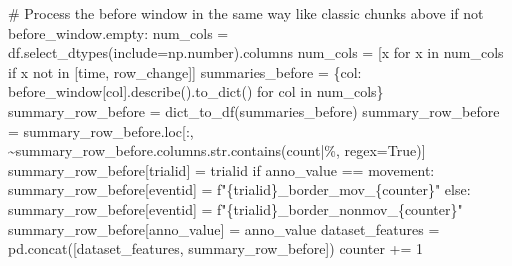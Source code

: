 \documentclass[
  letterpaper,
  DIV=11,
  numbers=noendperiod]{scrreprt}
\newenvironment{Shaded}{\begin{snugshade}}{\end{snugshade}}
\newcommand{\BuiltInTok}[1]{\textcolor[rgb]{0.00,0.23,0.31}{#1}}
\newcommand{\CommentTok}[1]{\textcolor[rgb]{0.37,0.37,0.37}{#1}}
\newcommand{\ControlFlowTok}[1]{\textcolor[rgb]{0.00,0.23,0.31}{#1}}
\newcommand{\DecValTok}[1]{\textcolor[rgb]{0.68,0.00,0.00}{#1}}
\newcommand{\KeywordTok}[1]{\textcolor[rgb]{0.00,0.23,0.31}{#1}}
\newcommand{\NormalTok}[1]{\textcolor[rgb]{0.00,0.23,0.31}{#1}}
\newcommand{\OperatorTok}[1]{\textcolor[rgb]{0.37,0.37,0.37}{#1}}
\newcommand{\SpecialCharTok}[1]{\textcolor[rgb]{0.37,0.37,0.37}{#1}}
\newcommand{\SpecialStringTok}[1]{\textcolor[rgb]{0.13,0.47,0.30}{#1}}
\newcommand{\StringTok}[1]{\textcolor[rgb]{0.13,0.47,0.30}{#1}}
\newcommand{\VariableTok}[1]{\textcolor[rgb]{0.07,0.07,0.07}{#1}}
\begin{document}
\begin{Shaded}
\begin{Highlighting}[]
            \CommentTok{\# Process the \textquotesingle{}before\textquotesingle{} window in the same way like classic chunks above}
            \ControlFlowTok{if} \KeywordTok{not}\NormalTok{ before\_window.empty:}
\NormalTok{                num\_cols }\OperatorTok{=}\NormalTok{ df.select\_dtypes(include}\OperatorTok{=}\NormalTok{np.number).columns}
\NormalTok{                num\_cols }\OperatorTok{=}\NormalTok{ [x }\ControlFlowTok{for}\NormalTok{ x }\KeywordTok{in}\NormalTok{ num\_cols }\ControlFlowTok{if}\NormalTok{ x }\KeywordTok{not} \KeywordTok{in}\NormalTok{ [}\StringTok{\textquotesingle{}time\textquotesingle{}}\NormalTok{, }\StringTok{\textquotesingle{}row\_change\textquotesingle{}}\NormalTok{]]}
\NormalTok{                summaries\_before }\OperatorTok{=}\NormalTok{ \{col: before\_window[col].describe().to\_dict() }\ControlFlowTok{for}\NormalTok{ col }\KeywordTok{in}\NormalTok{ num\_cols\}}
\NormalTok{                summary\_row\_before }\OperatorTok{=}\NormalTok{ dict\_to\_df(summaries\_before)}
\NormalTok{                summary\_row\_before }\OperatorTok{=}\NormalTok{ summary\_row\_before.loc[:, }\OperatorTok{\textasciitilde{}}\NormalTok{summary\_row\_before.columns.}\BuiltInTok{str}\NormalTok{.contains(}\StringTok{\textquotesingle{}count|\%\textquotesingle{}}\NormalTok{, regex}\OperatorTok{=}\VariableTok{True}\NormalTok{)]}
\NormalTok{                summary\_row\_before[}\StringTok{\textquotesingle{}trialid\textquotesingle{}}\NormalTok{] }\OperatorTok{=}\NormalTok{ trialid}
                \ControlFlowTok{if}\NormalTok{ anno\_value }\OperatorTok{==} \StringTok{\textquotesingle{}movement\textquotesingle{}}\NormalTok{:}
\NormalTok{                    summary\_row\_before[}\StringTok{\textquotesingle{}eventid\textquotesingle{}}\NormalTok{] }\OperatorTok{=} \SpecialStringTok{f"}\SpecialCharTok{\{}\NormalTok{trialid}\SpecialCharTok{\}}\SpecialStringTok{\_border\_mov\_}\SpecialCharTok{\{}\NormalTok{counter}\SpecialCharTok{\}}\SpecialStringTok{"}
                \ControlFlowTok{else}\NormalTok{:}
\NormalTok{                    summary\_row\_before[}\StringTok{\textquotesingle{}eventid\textquotesingle{}}\NormalTok{] }\OperatorTok{=} \SpecialStringTok{f"}\SpecialCharTok{\{}\NormalTok{trialid}\SpecialCharTok{\}}\SpecialStringTok{\_border\_nonmov\_}\SpecialCharTok{\{}\NormalTok{counter}\SpecialCharTok{\}}\SpecialStringTok{"}
\NormalTok{                summary\_row\_before[}\StringTok{\textquotesingle{}anno\_value\textquotesingle{}}\NormalTok{] }\OperatorTok{=}\NormalTok{ anno\_value}
\NormalTok{                dataset\_features }\OperatorTok{=}\NormalTok{ pd.concat([dataset\_features, summary\_row\_before])}
\NormalTok{                counter }\OperatorTok{+=} \DecValTok{1}


\end{Highlighting}
\end{Shaded}
\end{document}
